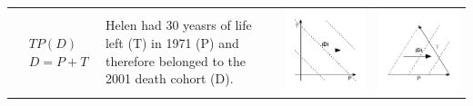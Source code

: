 \documentclass[11pt,oneside,a4paper]{article} %
\begin{document}
\begin{center}
\begin{longtable}{m{}m{}m{}m{}}
  \midrule
  $$\begin{aligned}
    &TP(D) \\
    &D = P + T
  \end{aligned}$$ & Helen had 30 yeasrs of life left (T) in 1971 (P) and
  therefore belonged to the 2001 death cohort (D). & \includegraphics[width =
  \linewidth]{Figures/JonasTable/TPd.pdf} & \includegraphics[width = \linewidth]{Figures/JonasTable/TPd_iso.pdf}  \\

\end{longtable}
\end{center}
\end{document}
